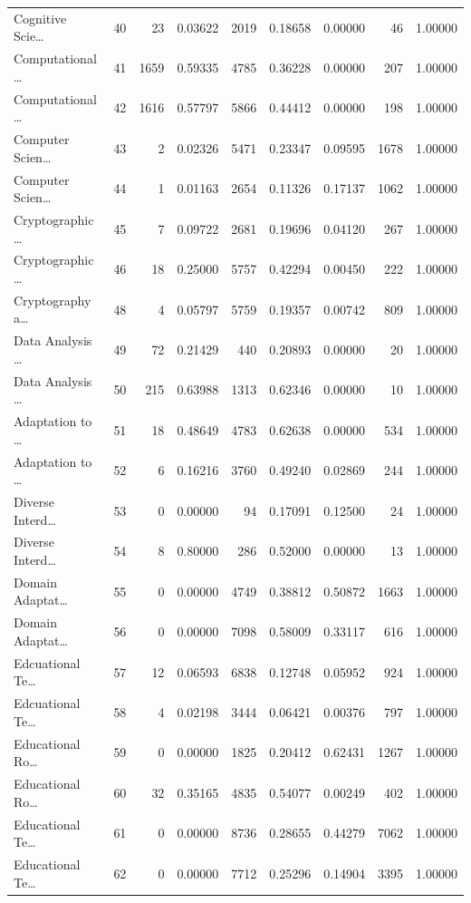 \begin{table}
\begin{tabular}{lrrrrrrrr}
Cognitive Scie… & 40 & 23 & 0.03622 & 2019 & 0.18658 & 0.00000 & 46 & 1.00000 \\
Computational … & 41 & 1659 & 0.59335 & 4785 & 0.36228 & 0.00000 & 207 & 1.00000 \\
Computational … & 42 & 1616 & 0.57797 & 5866 & 0.44412 & 0.00000 & 198 & 1.00000 \\
Computer Scien… & 43 & 2 & 0.02326 & 5471 & 0.23347 & 0.09595 & 1678 & 1.00000 \\
Computer Scien… & 44 & 1 & 0.01163 & 2654 & 0.11326 & 0.17137 & 1062 & 1.00000 \\
Cryptographic … & 45 & 7 & 0.09722 & 2681 & 0.19696 & 0.04120 & 267 & 1.00000 \\
Cryptographic … & 46 & 18 & 0.25000 & 5757 & 0.42294 & 0.00450 & 222 & 1.00000 \\
Cryptography a… & 48 & 4 & 0.05797 & 5759 & 0.19357 & 0.00742 & 809 & 1.00000 \\
Data Analysis … & 49 & 72 & 0.21429 & 440 & 0.20893 & 0.00000 & 20 & 1.00000 \\
Data Analysis … & 50 & 215 & 0.63988 & 1313 & 0.62346 & 0.00000 & 10 & 1.00000 \\
Adaptation to … & 51 & 18 & 0.48649 & 4783 & 0.62638 & 0.00000 & 534 & 1.00000 \\
Adaptation to … & 52 & 6 & 0.16216 & 3760 & 0.49240 & 0.02869 & 244 & 1.00000 \\
Diverse Interd… & 53 & 0 & 0.00000 & 94 & 0.17091 & 0.12500 & 24 & 1.00000 \\
Diverse Interd… & 54 & 8 & 0.80000 & 286 & 0.52000 & 0.00000 & 13 & 1.00000 \\
Domain Adaptat… & 55 & 0 & 0.00000 & 4749 & 0.38812 & 0.50872 & 1663 & 1.00000 \\
Domain Adaptat… & 56 & 0 & 0.00000 & 7098 & 0.58009 & 0.33117 & 616 & 1.00000 \\
Edcuational Te… & 57 & 12 & 0.06593 & 6838 & 0.12748 & 0.05952 & 924 & 1.00000 \\
Edcuational Te… & 58 & 4 & 0.02198 & 3444 & 0.06421 & 0.00376 & 797 & 1.00000 \\
Educational Ro… & 59 & 0 & 0.00000 & 1825 & 0.20412 & 0.62431 & 1267 & 1.00000 \\
Educational Ro… & 60 & 32 & 0.35165 & 4835 & 0.54077 & 0.00249 & 402 & 1.00000 \\
Educational Te… & 61 & 0 & 0.00000 & 8736 & 0.28655 & 0.44279 & 7062 & 1.00000 \\
Educational Te… & 62 & 0 & 0.00000 & 7712 & 0.25296 & 0.14904 & 3395 & 1.00000 \\

\end{tabular}
\end{table}
